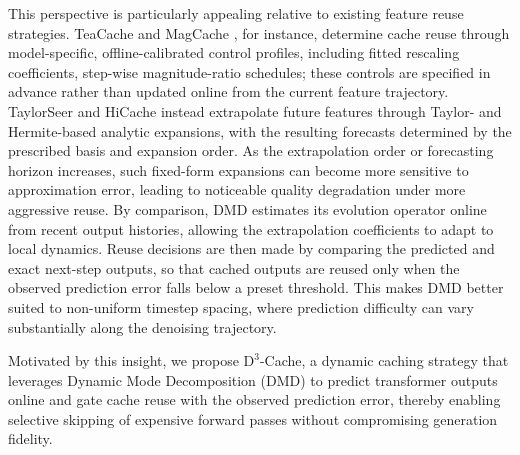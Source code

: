 This perspective is particularly appealing
relative to existing feature reuse strategies.
TeaCache \cite{liu2024timestep}
and MagCache \cite{ma2025magcache},
for instance,
determine cache reuse through model-specific,
offline-calibrated control profiles,
including fitted rescaling coefficients,
step-wise magnitude-ratio schedules; 
these controls are specified in advance
rather than updated online from the current feature trajectory.
TaylorSeer \cite{TaylorSeer2025}
and HiCache \cite{feng2025hicachetrainingfreeaccelerationdiffusion}
instead extrapolate future features
through Taylor- and Hermite-based analytic expansions,
with the resulting forecasts determined
by the prescribed basis and expansion order.
As the extrapolation order or forecasting horizon increases,
such fixed-form expansions can become more sensitive to approximation error,
leading to noticeable quality degradation under more aggressive reuse.
By comparison,
DMD estimates its evolution operator online from recent output histories,
allowing the extrapolation coefficients to adapt to local dynamics.
Reuse decisions are then made by comparing the predicted and exact next-step outputs,
so that cached outputs are reused only when the observed prediction error
falls below a preset threshold.
This makes DMD better suited to non-uniform timestep spacing,
where prediction difficulty can vary substantially along the denoising trajectory.


Motivated by this insight,
we propose $\mathrm{D}^3$-Cache,
a dynamic caching strategy
that leverages Dynamic Mode Decomposition (DMD) to 
predict transformer outputs online
and gate cache reuse with the observed prediction error,
thereby enabling selective skipping of expensive forward passes
without compromising generation fidelity.


